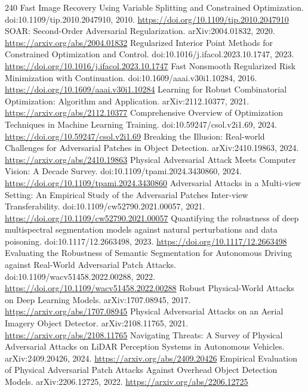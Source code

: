 \documentclass[11pt]{article}
\begin{document}
\begin{thebibliography}{240}
 Fast Image Recovery Using Variable Splitting and Constrained Optimization. doi:10.1109/tip.2010.2047910, 2010. \url{https://doi.org/10.1109/tip.2010.2047910}
 SOAR: Second-Order Adversarial Regularization. arXiv:2004.01832, 2020. \url{https://arxiv.org/abs/2004.01832}
 Regularized Interior Point Methods for Constrained Optimization and Control. doi:10.1016/j.ifacol.2023.10.1747, 2023. \url{https://doi.org/10.1016/j.ifacol.2023.10.1747}
 Fast Nonsmooth Regularized Risk Minimization with Continuation. doi:10.1609/aaai.v30i1.10284, 2016. \url{https://doi.org/10.1609/aaai.v30i1.10284}
 Learning for Robust Combinatorial Optimization: Algorithm and Application. arXiv:2112.10377, 2021. \url{https://arxiv.org/abs/2112.10377}
 Comprehensive Overview of Optimization Techniques in Machine Learning Training. doi:10.59247/csol.v2i1.69, 2024. \url{https://doi.org/10.59247/csol.v2i1.69}
 Breaking the Illusion: Real-world Challenges for Adversarial Patches in Object Detection. arXiv:2410.19863, 2024. \url{https://arxiv.org/abs/2410.19863}
 Physical Adversarial Attack Meets Computer Vision: A Decade Survey. doi:10.1109/tpami.2024.3430860, 2024. \url{https://doi.org/10.1109/tpami.2024.3430860}
 Adversarial Attacks in a Multi-view Setting: An Empirical Study of the Adversarial Patches Inter-view Transferability. doi:10.1109/cw52790.2021.00057, 2021. \url{https://doi.org/10.1109/cw52790.2021.00057}
 Quantifying the robustness of deep multispectral segmentation models against natural perturbations and data poisoning. doi:10.1117/12.2663498, 2023. \url{https://doi.org/10.1117/12.2663498}
 Evaluating the Robustness of Semantic Segmentation for Autonomous Driving against Real-World Adversarial Patch Attacks. doi:10.1109/wacv51458.2022.00288, 2022. \url{https://doi.org/10.1109/wacv51458.2022.00288}
 Robust Physical-World Attacks on Deep Learning Models. arXiv:1707.08945, 2017. \url{https://arxiv.org/abs/1707.08945}
 Physical Adversarial Attacks on an Aerial Imagery Object Detector. arXiv:2108.11765, 2021. \url{https://arxiv.org/abs/2108.11765}
 Navigating Threats: A Survey of Physical Adversarial Attacks on LiDAR Perception Systems in Autonomous Vehicles. arXiv:2409.20426, 2024. \url{https://arxiv.org/abs/2409.20426}
 Empirical Evaluation of Physical Adversarial Patch Attacks Against Overhead Object Detection Models. arXiv:2206.12725, 2022. \url{https://arxiv.org/abs/2206.12725}

\end{thebibliography}
\end{document}
